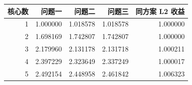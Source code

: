\begin{tabular}{rrrrr}
\toprule
核心数 & 问题一 & 问题二 & 问题三 & 同方案 L2 收益 \\
\midrule
1 & 1.000000 & 1.018578 & 1.018578 & 1.000000 \\
2 & 1.698169 & 1.742807 & 1.742807 & 1.000000 \\
3 & 2.179960 & 2.131178 & 2.131718 & 1.000211 \\
4 & 2.397229 & 2.323649 & 2.337249 & 1.000017 \\
5 & 2.492154 & 2.448958 & 2.461842 & 1.006323 \\
\bottomrule
\end{tabular}
